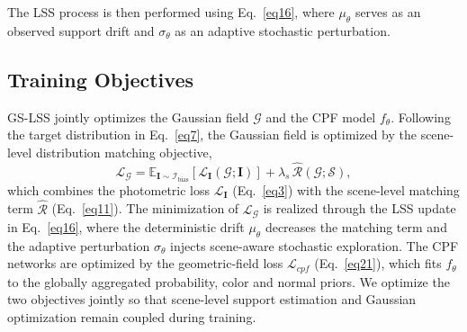 \documentclass[lettersize,journal]{IEEEtran}
\begin{document}
The LSS process is then performed using Eq.~\ref{eq16}, where $\mu_{\theta}$ serves as an observed support drift and $\sigma_{\theta}$ as an adaptive stochastic perturbation.  

\subsection{Training Objectives}

GS-LSS jointly optimizes the Gaussian field $\mathcal{G}$ and the CPF model $f_{\theta}$. Following the target distribution in Eq.~\ref{eq7}, the Gaussian field is optimized by the scene-level distribution matching objective,
\begin{equation}
    \mathcal{L}_{\mathcal{G}} = \mathbb{E}_{\mathbf{I} \sim \mathcal{I}_{\text{bias}}} \left[ \mathcal{L}_{\mathbf{I}}(\mathcal{G};\mathbf{I}) \right] + \lambda_{s} \, \widehat{\mathcal{R}}(\mathcal{G};\mathcal{S}),
    \label{eq26}
\end{equation}
which combines the photometric loss $\mathcal{L}_{\mathbf{I}}$ (Eq.~\ref{eq3}) with the scene-level matching term $\widehat{\mathcal{R}}$ (Eq.~\ref{eq11}). The minimization of $\mathcal{L}_{\mathcal{G}}$ is realized through the LSS update in Eq.~\ref{eq16}, where the deterministic drift $\mu_{\theta}$ decreases the matching term and the adaptive perturbation $\sigma_{\theta}$ injects scene-aware stochastic exploration. The CPF networks are optimized by the geometric-field loss $\mathcal{L}_{cpf}$ (Eq.~\ref{eq21}), which fits $f_{\theta}$ to the globally aggregated probability, color and normal priors. 
We optimize the two objectives jointly so that scene-level support estimation and Gaussian optimization remain coupled during training.
    
\end{document}
